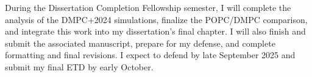 \documentclass{article}
\newcommand{\na}{Na\textsuperscript{+}}
\newcommand{\li}{Li\textsuperscript{+}}
\begin{document}
During the Dissertation Completion Fellowship semester, I will complete the analysis of the DMPC+2024 simulations, 
finalize the POPC/DMPC comparison, and integrate this work into my dissertation’s
final chapter. I will also finish and submit the associated manuscript, prepare for my defense, and complete
formatting and final revisions. I expect to defend by late September 2025 and submit my final ETD by early
October.

%
\end{document}
